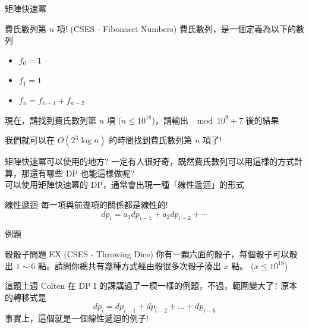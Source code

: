 \documentclass[aspectratio=169]{beamer}
\begin{document}
\begin{frame}[fragile]{矩陣快速冪}
    \begin{block}{費氏數列第 $n$ 項! (CSES - Fibonacci Numbers)}
        費氏數列，是一個定義為以下的數列
        \begin{itemize}
            \item $f_0 = 1$
            \item $f_1 = 1$
            \item $f_n = f_{n-1}+f_{n-2}$
        \end{itemize}
        現在，請找到費氏數列第 $n$ 項 ($n \le 10^{18}$)，請輸出 $\mod 10^9+7$ 後的結果
    \end{block}
    我們就可以在 $O(2^3 \log n)$ 的時間找到費氏數列第 $n$ 項了!
\end{frame}

\begin{frame}[fragile]{矩陣快速冪可以使用的地方?}
    一定有人很好奇，既然費氏數列可以用這樣的方式計算，那還有哪些 DP 也能這樣做呢? \\ \pause
    可以使用矩陣快速冪的 DP，通常會出現一種「線性遞迴」的形式 
    \begin{alertblock}{線性遞迴}
        每一項與前幾項的關係都是線性的!
        $$dp_i = a_1 dp_{i-1} + a_2 dp_{i-2} + \cdots $$
    \end{alertblock}
\end{frame}

\begin{frame}[fragile]{例題}
    \begin{block}{骰骰子問題 EX (CSES - Throwing Dice)}
        你有一顆六面的骰子，每個骰子可以骰出 $1 \sim 6$ 點。請問你總共有幾種方式經由骰很多次骰子湊出 $x$ 點。 ($x \le 10^{18}$)
    \end{block} \pause
    這題上週 Colten 在 DP I 的課講過了一模一樣的例題，不過，範圍變大了? \pause
    原本的轉移式是
        $$dp_i = dp_{i-1} + dp_{i-2} + \dots + dp_{i-6}$$ \pause
    事實上，這個就是一個線性遞迴的例子!
\end{frame}
\end{document}
